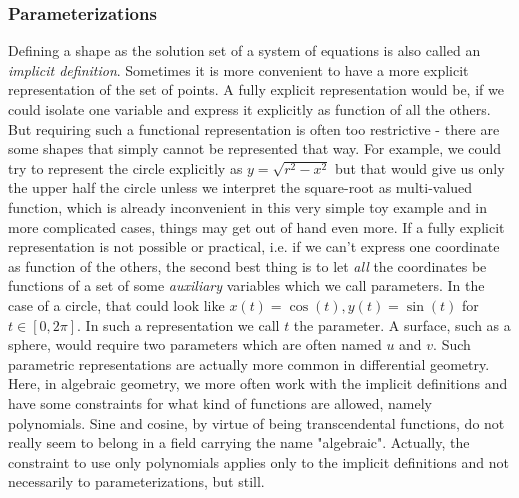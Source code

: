 

\subsubsection{Parameterizations}
Defining a shape as the solution set of a system of equations is also called an \emph{implicit definition}. Sometimes it is more convenient to have a more explicit representation of the set of points. A fully explicit representation would be, if we could isolate one variable and express it explicitly as function of all the others. But requiring such a functional representation is often too restrictive - there are some shapes that simply cannot be represented that way. For example, we could try to represent the circle explicitly as $y = \sqrt{r^2 - x^2}$ but that would give us only the upper half the circle unless we interpret the square-root as multi-valued function, which is already inconvenient in this very simple toy example and in more complicated cases, things may get out of hand even more. If a fully explicit representation is not possible or practical, i.e. if we can't express one coordinate as function of the others, the second best thing is to let \emph{all} the coordinates be functions of a set of some \emph{auxiliary} variables which we call parameters. In the case of a circle, that could look like $x(t) = \cos(t), y(t) = \sin(t)$ for $t \in [0, 2 \pi]$. In such a representation we call $t$ the parameter. A surface, such as a sphere, would require two parameters which are often named $u$ and $v$. Such parametric representations are actually more common in differential geometry. Here, in algebraic geometry, we more often work with the implicit definitions and have some constraints for what kind of functions are allowed, namely polynomials. Sine and cosine, by virtue of being transcendental functions, do not really seem to belong in a field carrying the name "algebraic". Actually, the constraint to use only polynomials applies only to the implicit definitions and not necessarily to parameterizations, but still.


